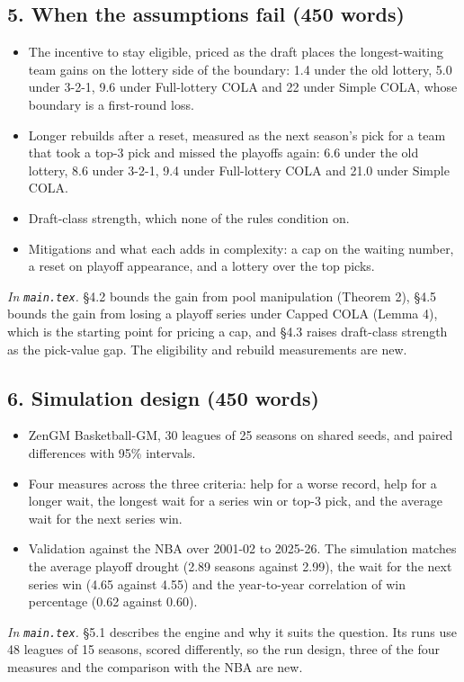 \documentclass[10pt]{article}
\newcommand{\inmain}[1]{\textit{In \texttt{main.tex}.} #1\par}
\begin{document}
\subsection{5. When the assumptions fail (450 words)}
\begin{itemize}
\item The incentive to stay eligible, priced as the draft places the longest-waiting team gains on the lottery side of the boundary: 1.4 under the old lottery, 5.0 under 3-2-1, 9.6 under Full-lottery COLA and 22 under Simple COLA, whose boundary is a first-round loss.
\item Longer rebuilds after a reset, measured as the next season's pick for a team that took a top-3 pick and missed the playoffs again: 6.6 under the old lottery, 8.6 under 3-2-1, 9.4 under Full-lottery COLA and 21.0 under Simple COLA.
\item Draft-class strength, which none of the rules condition on.
\item Mitigations and what each adds in complexity: a cap on the waiting number, a reset on playoff appearance, and a lottery over the top picks.
\end{itemize}
\inmain{\S4.2 bounds the gain from pool manipulation (Theorem 2), \S4.5 bounds the gain from losing a playoff series under Capped COLA (Lemma 4), which is the starting point for pricing a cap, and \S4.3 raises draft-class strength as the pick-value gap. The eligibility and rebuild measurements are new.}

\subsection{6. Simulation design (450 words)}
\begin{itemize}
\item ZenGM Basketball-GM, 30 leagues of 25 seasons on shared seeds, and paired differences with 95\% intervals.
\item Four measures across the three criteria: help for a worse record, help for a longer wait, the longest wait for a series win or top-3 pick, and the average wait for the next series win.
\item Validation against the NBA over 2001-02 to 2025-26. The simulation matches the average playoff drought (2.89 seasons against 2.99), the wait for the next series win (4.65 against 4.55) and the year-to-year correlation of win percentage (0.62 against 0.60).
\end{itemize}
\inmain{\S5.1 describes the engine and why it suits the question. Its runs use 48 leagues of 15 seasons, scored differently, so the run design, three of the four measures and the comparison with the NBA are new.}
\end{document}
